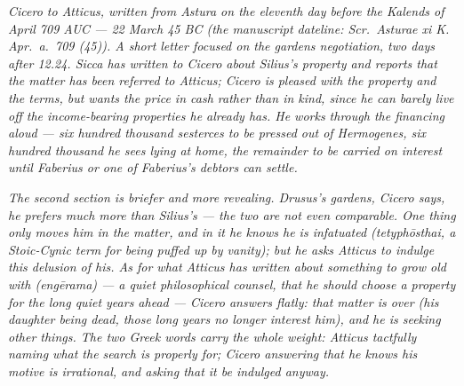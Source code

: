 
\textit{Cicero to Atticus, written from Astura on the
eleventh day before the Kalends of April 709 AUC ---
22 March 45 BC (the manuscript dateline: \textit{Scr.\
Asturae xi K. Apr.\ a.\ 709 (45)}). A short letter
focused on the gardens negotiation, two days after
12.24. Sicca has written to Cicero about Silius's
property and reports that the matter has been referred
to Atticus; Cicero is pleased with the property and
the terms, but wants the price in cash rather than in
kind, since he can barely live off the income-bearing
properties he already has. He works through the
financing aloud --- six hundred thousand sesterces to
be pressed out of Hermogenes, six hundred thousand he
sees lying at home, the remainder to be carried on
interest until Faberius or one of Faberius's debtors
can settle.}

\textit{The second section is briefer and more
revealing. Drusus's gardens, Cicero says, he prefers
much more than Silius's --- the two are not even
comparable. One thing only moves him in the matter,
and in it he knows he is \textit{infatuated}
(\textit{tetyphōsthai}, a Stoic-Cynic term for being
puffed up by vanity); but he asks Atticus to indulge
this delusion of his. As for what Atticus has
written about \textit{something to grow old with}
(\textit{engērama}) --- a quiet philosophical
counsel, that he should choose a property for the
long quiet years ahead --- Cicero answers flatly:
that matter is over (his daughter being dead, those
long years no longer interest him), and he is seeking
other things. The two Greek words carry the whole
weight: Atticus tactfully naming what the search is
properly for; Cicero answering that he knows his
motive is irrational, and asking that it be indulged
anyway.}
